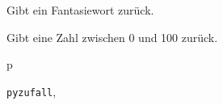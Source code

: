 \documentclass[a4paper,12pt,oneside]{sphinxmanual}
\begin{document}

\begin{fulllineitems}
\label{funktionen:pyzufall.wort}
Gibt ein Fantasiewort zurück.

\end{fulllineitems}


\begin{fulllineitems}
\label{funktionen:pyzufall.zahl}
Gibt eine Zahl zwischen 0 und 100 zurück.

\end{fulllineitems}



\renewcommand{\indexname}{Python-Modulindex}
\begin{theindex}
\def\bigletter#1{{\Large\sffamily#1}\nopagebreak\vspace{1mm}}
\bigletter{p}
\item {\texttt{pyzufall}}, \pageref{funktionen:module-pyzufall}
\end{theindex}

\renewcommand{\indexname}{Stichwortverzeichnis}
\printindex
\end{document}
